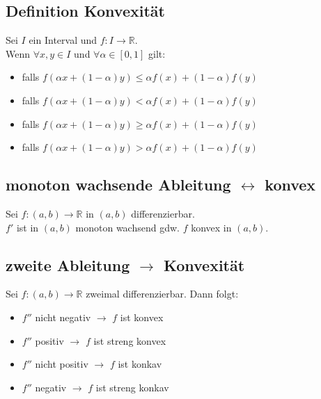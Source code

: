 \documentclass[halfparscip]{scrartcl}
\newcounter{subsection2}
\begin{document}
\addtocounter{subsection}{3}
\subsection{Definition Konvexität}
Sei $I$ ein Interval und $f : I \rightarrow \mathbb{R}$.\\
Wenn $\forall x,y \in I$ und $\forall \alpha \in [0,1]$ gilt:
\begin{itemize}
	\item {} falls $f(\alpha x + (1 - \alpha)y) \leq \alpha f(x) + (1 - \alpha)f(y)$
	\item {} falls $f(\alpha x + (1 - \alpha)y) < \alpha f(x) + (1 - \alpha)f(y)$
	\item {} falls $f(\alpha x + (1 - \alpha)y) \geq \alpha f(x) + (1 - \alpha)f(y)$
	\item {} falls $f(\alpha x + (1 - \alpha)y) > \alpha f(x) + (1 - \alpha)f(y)$
\end{itemize}

\addtocounter{subsection}{-2}
\subsection{monoton wachsende Ableitung $\leftrightarrow$ konvex}
Sei $f: (a,b) \rightarrow \mathbb{R}$ in $(a,b)$ differenzierbar.\\
$f'$ ist in $(a,b)$ monoton wachsend gdw. $f$ konvex in $(a,b)$.

\subsection{zweite Ableitung $\rightarrow$ Konvexität}
Sei $f : (a,b) \rightarrow \mathbb{R}$ zweimal differenzierbar. Dann folgt:
\begin{itemize}
	\item $f''$ nicht negativ $\rightarrow$ $f$ ist konvex
	\item $f''$ positiv $\rightarrow$ $f$ ist streng konvex
	\item $f''$ nicht positiv $\rightarrow$ $f$ ist konkav
	\item $f''$ negativ $\rightarrow$ $f$ ist streng konkav
\end{itemize}
\end{document}
